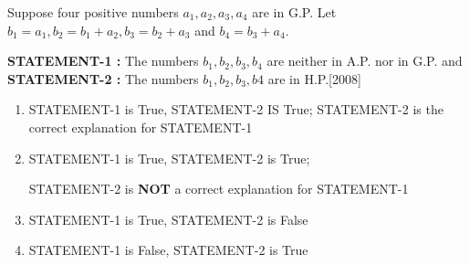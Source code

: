 \iffalse
\title{Assignment1}
\author{DULLA KARTHIK}
\section{ar}
\fi




\item Suppose four positive numbers $a_{1},a_{2},a_{3},a_{4}$ are in G.P. Let $b_{1} = a_{1}, b_{2} = b_{1} + a_{2}, b_{3} = b_{2} + a_{3}$ and $b_{4} = b_{3} + a_{4}$.

\textbf{STATEMENT-1 :} The numbers $b_{1},b_{2},b_{3},b_{4}$ are neither in A.P. nor in G.P. and \textbf{STATEMENT-2 :} The numbers $b_{1},b_{2},b_{3},b{4}$ are in H.P.\hfill[2008]

\begin{enumerate}
    

\item STATEMENT-1 is True, STATEMENT-2 IS True; STATEMENT-2 is the correct explanation for STATEMENT-1

\item STATEMENT-1 is True, STATEMENT-2 is True;

STATEMENT-2 is \textbf{NOT} a correct explanation for STATEMENT-1

\item STATEMENT-1 is True, STATEMENT-2 is False

\item STATEMENT-1 is False, STATEMENT-2 is True
\end{enumerate}
